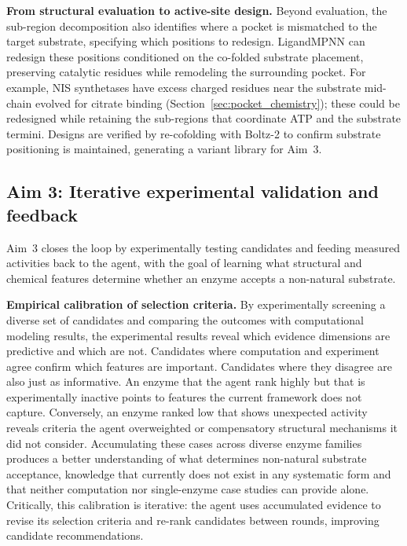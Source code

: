 \documentclass[12pt]{article}
\begin{document}
\textbf{From structural evaluation to active-site design.} Beyond evaluation, the sub-region decomposition also identifies where a pocket is mismatched to the target substrate, specifying which positions to redesign. LigandMPNN\cite{dauparas2025ligandmpnn} can redesign these positions conditioned on the co-folded substrate placement, preserving catalytic residues while remodeling the surrounding pocket. For example, NIS synthetases have excess charged residues near the substrate mid-chain evolved for citrate binding (Section~\ref{sec:pocket_chemistry}); these could be redesigned while retaining the sub-regions that coordinate ATP and the substrate termini. Designs are verified by re-cofolding with Boltz-2 to confirm substrate positioning is maintained, generating a variant library for Aim~3.

\subsection{Aim 3: Iterative experimental validation and feedback}

Aim~3 closes the loop by experimentally testing candidates and feeding measured activities back to the agent, with the goal of learning what structural and chemical features determine whether an enzyme accepts a non-natural substrate.

\textbf{Empirical calibration of selection criteria.} By experimentally screening a diverse set of candidates and comparing the outcomes with computational modeling results, the experimental results reveal which evidence dimensions are predictive and which are not. Candidates where computation and experiment agree confirm which features are important. Candidates where they disagree are also just as informative. An enzyme that the agent rank highly but that is experimentally inactive points to features the current framework does not capture. Conversely, an enzyme ranked low that shows unexpected activity reveals criteria the agent overweighted or compensatory structural mechanisms it did not consider. Accumulating these cases across diverse enzyme families produces a better understanding of what determines non-natural substrate acceptance, knowledge that currently does not exist in any systematic form and that neither computation nor single-enzyme case studies can provide alone. Critically, this calibration is iterative: the agent uses accumulated evidence to revise its selection criteria and re-rank candidates between rounds, improving candidate recommendations.
\end{document}
